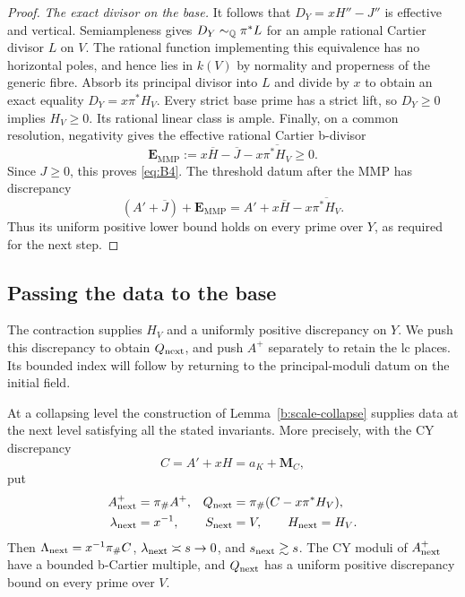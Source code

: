 \begin{proof}
\smallskip\noindent
\emph{The exact divisor on the base.}
It follows that $D_Y=xH''-J''$ is effective and vertical.  Semiampleness
gives $D_Y\sim_{\mathbb Q}\pi^*L$ for an ample rational Cartier divisor $L$
on $V$.  The rational function implementing this equivalence has no
horizontal poles, and hence lies in $k(V)$ by normality and properness
of the generic fibre.  Absorb its principal divisor into $L$ and divide
by $x$ to obtain an exact equality
$D_Y=x\pi^*H_V$.  Every strict base prime has a strict lift, so
$D_Y\ge0$ implies $H_V\ge0$.  Its rational linear class is ample.
Finally, on a common resolution, negativity gives the effective
rational Cartier b-divisor
\begin{equation}\label{b:scale-mmp-correction}
 \mathbf E_{\mathrm{MMP}}
       :=x\overline H-\overline J-x\overline{\pi^*H_V}\ge0.
\end{equation}
Since $J\ge0$, this proves \eqref{eq:B4}. The threshold datum after
the MMP has discrepancy
\[
 (A'+\overline J)+\mathbf E_{\mathrm{MMP}}
       =A'+x\overline H-x\overline{\pi^*H_V}.
\]
Thus its uniform positive lower bound holds on every prime over $Y$,
as required for the next step.
\end{proof}

\subsection{Passing the data to the base}

The contraction supplies $H_V$ and a uniformly positive discrepancy on
$Y$. We push this discrepancy to obtain $Q_{\rm next}$, and push $A^+$
separately to retain the lc places. Its bounded index will follow by
returning to the principal-moduli datum on the initial field.

\begin{proposition}\label{b:scale-inheritance}
At a collapsing level the construction of
Lemma~\ref{b:scale-collapse} supplies data at the next level satisfying
all the stated invariants.  More precisely, with the CY discrepancy
\[
                  C=A'+xH=a_K+\mathbf M_C,
\]
put
\begin{equation}\label{b:scale-next-data}
 \begin{aligned}
 A^+_{\rm next}&=\pi_\#A^+,&
 Q_{\rm next}&=\pi_\#(C-x\pi^*H_V),\\
 \lambda_{\rm next}&=x^{-1},&
 S_{\rm next}&=V,\qquad H_{\rm next}=H_V.
 \end{aligned}
\end{equation}
Then $\Lambda_{\rm next}=x^{-1}\pi_\#C$,
$\lambda_{\rm next}\asymp s\to0$, and $s_{\rm next}\gtrsim s$.
The CY moduli of $A^+_{\rm next}$ have a bounded b-Cartier multiple,
and $Q_{\rm next}$ has a uniform positive discrepancy bound on every
prime over $V$.
\end{proposition}

